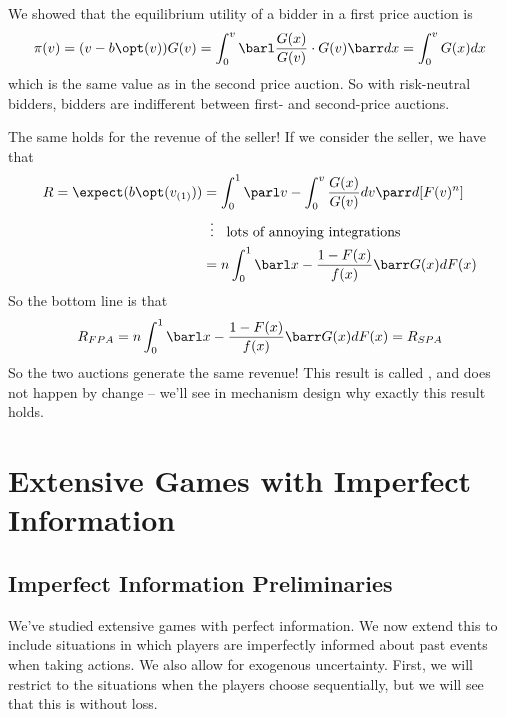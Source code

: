 \documentclass[10pt]{article}
\begin{document}
\begin{remark}
	We showed that the equilibrium utility of a bidder in a first price auction is \[\pi(v) = (v - b\opt(v))G(v) = \int_0^v \barl \frac{G(x)}{G(v)} \cdot G(v) \barr dx = \int_0^v G(x)dx\]which is the same value as in the second price auction. So with risk-neutral bidders, bidders are indifferent between first- and second-price auctions.
\end{remark}

\begin{remark}
	The same holds for the revenue of the seller! If we consider the seller, we have that
	\begin{align*}
		R = \expect(b\opt(v_{(1)})) &= \int_0^1 \parl v - \int_0^v \frac{G(x)}{G(v)}dv\parr d[F(v)^n] \\ &\;\;\vdots\;\; \text{   lots of annoying integrations} \\ &= n \int_0^1 \barl x - \frac{1-F(x)}{f(x)}\barr G(x)dF(x) 
	\end{align*}
	So the bottom line is that \[R_{FPA} =  n \int_0^1 \barl x - \frac{1-F(x)}{f(x)}\barr G(x)dF(x)  = R_{SPA}\]So the two auctions generate the same revenue! This result is called , and does not happen by change -- we'll see in mechanism design why exactly this result holds.
\end{remark}


\section{Extensive Games with Imperfect Information}

\subsection{Imperfect Information Preliminaries}

\begin{remark}
	We've studied extensive games with perfect information. We now extend this to include situations in which players are imperfectly informed about past events when taking actions. We also allow for exogenous uncertainty. First, we will restrict to the situations when the players choose sequentially, but we will see that this is without loss.
\end{remark}
\end{document}
